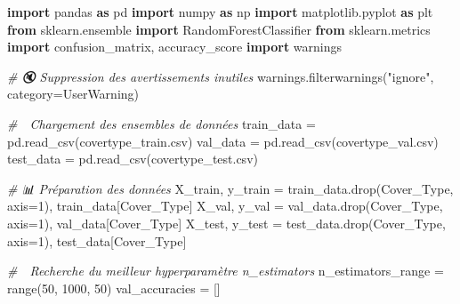 \documentclass[
  letterpaper,
  DIV=11,
  numbers=noendperiod]{scrartcl}
\newenvironment{Shaded}{}{}
\newcommand{\BuiltInTok}[1]{\textcolor[rgb]{0.00,0.50,0.00}{#1}}
\newcommand{\CommentTok}[1]{\textcolor[rgb]{0.38,0.63,0.69}{\textit{#1}}}
\newcommand{\DecValTok}[1]{\textcolor[rgb]{0.25,0.63,0.44}{#1}}
\newcommand{\ImportTok}[1]{\textcolor[rgb]{0.00,0.50,0.00}{\textbf{#1}}}
\newcommand{\NormalTok}[1]{#1}
\newcommand{\OperatorTok}[1]{\textcolor[rgb]{0.40,0.40,0.40}{#1}}
\newcommand{\PreprocessorTok}[1]{\textcolor[rgb]{0.74,0.48,0.00}{#1}}
\newcommand{\StringTok}[1]{\textcolor[rgb]{0.25,0.44,0.63}{#1}}
\begin{document}
\begin{Shaded}
\begin{Highlighting}[]
\ImportTok{import}\NormalTok{ pandas }\ImportTok{as}\NormalTok{ pd}
\ImportTok{import}\NormalTok{ numpy }\ImportTok{as}\NormalTok{ np}
\ImportTok{import}\NormalTok{ matplotlib.pyplot }\ImportTok{as}\NormalTok{ plt}
\ImportTok{from}\NormalTok{ sklearn.ensemble }\ImportTok{import}\NormalTok{ RandomForestClassifier}
\ImportTok{from}\NormalTok{ sklearn.metrics }\ImportTok{import}\NormalTok{ confusion\_matrix, accuracy\_score}
\ImportTok{import}\NormalTok{ warnings}

\CommentTok{\# 🔇 Suppression des avertissements inutiles}
\NormalTok{warnings.filterwarnings(}\StringTok{"ignore"}\NormalTok{, category}\OperatorTok{=}\PreprocessorTok{UserWarning}\NormalTok{)}

\CommentTok{\# 🔄 Chargement des ensembles de données}
\NormalTok{train\_data }\OperatorTok{=}\NormalTok{ pd.read\_csv(}\StringTok{\textquotesingle{}covertype\_train.csv\textquotesingle{}}\NormalTok{)}
\NormalTok{val\_data }\OperatorTok{=}\NormalTok{ pd.read\_csv(}\StringTok{\textquotesingle{}covertype\_val.csv\textquotesingle{}}\NormalTok{)}
\NormalTok{test\_data }\OperatorTok{=}\NormalTok{ pd.read\_csv(}\StringTok{\textquotesingle{}covertype\_test.csv\textquotesingle{}}\NormalTok{)}

\CommentTok{\# 📊 Préparation des données}
\NormalTok{X\_train, y\_train }\OperatorTok{=}\NormalTok{ train\_data.drop(}\StringTok{\textquotesingle{}Cover\_Type\textquotesingle{}}\NormalTok{, axis}\OperatorTok{=}\DecValTok{1}\NormalTok{), train\_data[}\StringTok{\textquotesingle{}Cover\_Type\textquotesingle{}}\NormalTok{]}
\NormalTok{X\_val, y\_val }\OperatorTok{=}\NormalTok{ val\_data.drop(}\StringTok{\textquotesingle{}Cover\_Type\textquotesingle{}}\NormalTok{, axis}\OperatorTok{=}\DecValTok{1}\NormalTok{), val\_data[}\StringTok{\textquotesingle{}Cover\_Type\textquotesingle{}}\NormalTok{]}
\NormalTok{X\_test, y\_test }\OperatorTok{=}\NormalTok{ test\_data.drop(}\StringTok{\textquotesingle{}Cover\_Type\textquotesingle{}}\NormalTok{, axis}\OperatorTok{=}\DecValTok{1}\NormalTok{), test\_data[}\StringTok{\textquotesingle{}Cover\_Type\textquotesingle{}}\NormalTok{]}

\CommentTok{\# 🎯 Recherche du meilleur hyperparamètre n\_estimators}
\NormalTok{n\_estimators\_range }\OperatorTok{=} \BuiltInTok{range}\NormalTok{(}\DecValTok{50}\NormalTok{, }\DecValTok{1000}\NormalTok{, }\DecValTok{50}\NormalTok{)}
\NormalTok{val\_accuracies }\OperatorTok{=}\NormalTok{ []}


\end{Highlighting}
\end{Shaded}
\end{document}

